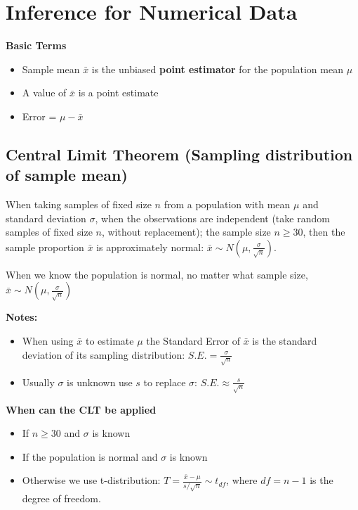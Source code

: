 \documentclass[
]{book}
\providecommand{\tightlist}{%
  \setlength{\itemsep}{0pt}\setlength{\parskip}{0pt}}
\begin{document}
\chapter{Inference for Numerical Data}\label{inference-for-numerical-data}

\textbf{Basic Terms}

\begin{itemize}
\tightlist
\item
  Sample mean \(\bar{x}\) is the unbiased \textbf{point estimator} for the population mean \(\mu\)
\item
  A value of \(\bar{x}\) is a point estimate
\item
  Error = \(\mu - \bar{x}\)
\end{itemize}

\section{Central Limit Theorem (Sampling distribution of sample mean)}\label{central-limit-theorem-sampling-distribution-of-sample-mean}

When taking samples of fixed size \(n\) from a population with mean \(\mu\) and standard deviation \(\sigma\), when the observations are independent (take random samples of fixed size \(n\), without replacement); the sample size \(n \geq 30\), then the sample proportion \(\bar{x}\) is approximately normal: \(\bar{x} \sim N(\mu, \frac{\sigma}{\sqrt{n}})\).

When we know the population is normal, no matter what sample size, \(\bar{x} \sim N(\mu, \frac{\sigma}{\sqrt{n}})\)

\textbf{Notes:}

\begin{itemize}
\tightlist
\item
  When using \(\bar{x}\) to estimate \(\mu\) the Standard Error of \(\bar{x}\) is the standard deviation of its sampling distribution: \(S.E. = \frac{\sigma}{\sqrt{n}}\)
\item
  Usually \(\sigma\) is unknown use \(s\) to replace \(\sigma\): \(S.E. \approx \frac{s}{\sqrt{n}}\)
\end{itemize}

\textbf{When can the CLT be applied}

\begin{itemize}
\tightlist
\item
  If \(n \geq 30\) and \(\sigma\) is known
\item
  If the population is normal and \(\sigma\) is known
\item
  Otherwise we use t-distribution: \(T = \frac{\bar{x} - \mu}{s/\sqrt{n}} \sim t_{df}\), where \(df=n-1\) is the degree of freedom.
\end{itemize}
\end{document}
